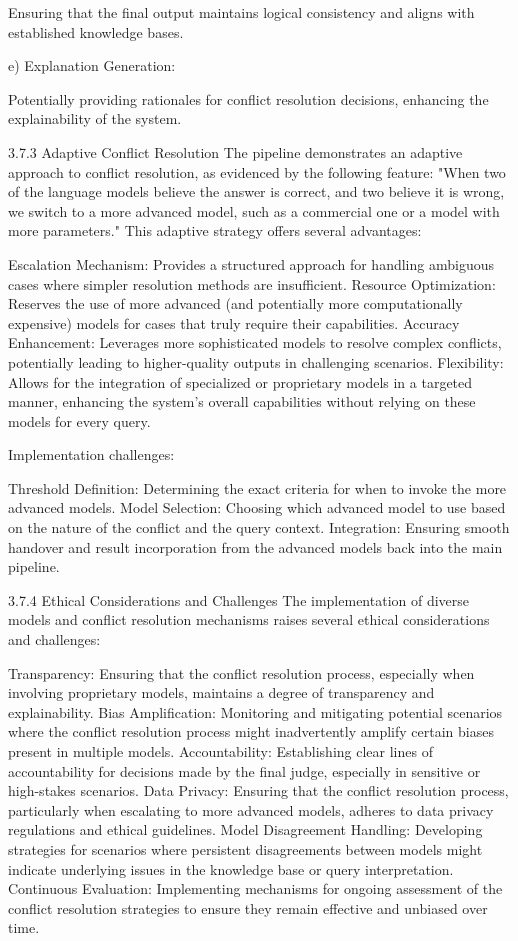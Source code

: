 Ensuring that the final output maintains logical consistency and aligns with established knowledge bases.

e) Explanation Generation:

Potentially providing rationales for conflict resolution decisions, enhancing the explainability of the system.

3.7.3 Adaptive Conflict Resolution
The pipeline demonstrates an adaptive approach to conflict resolution, as evidenced by the following feature:
"When two of the language models believe the answer is correct, and two believe it is wrong, we switch to a more advanced model, such as a commercial one or a model with more parameters."
This adaptive strategy offers several advantages:

Escalation Mechanism: Provides a structured approach for handling ambiguous cases where simpler resolution methods are insufficient.
Resource Optimization: Reserves the use of more advanced (and potentially more computationally expensive) models for cases that truly require their capabilities.
Accuracy Enhancement: Leverages more sophisticated models to resolve complex conflicts, potentially leading to higher-quality outputs in challenging scenarios.
Flexibility: Allows for the integration of specialized or proprietary models in a targeted manner, enhancing the system's overall capabilities without relying on these models for every query.

Implementation challenges:

Threshold Definition: Determining the exact criteria for when to invoke the more advanced models.
Model Selection: Choosing which advanced model to use based on the nature of the conflict and the query context.
Integration: Ensuring smooth handover and result incorporation from the advanced models back into the main pipeline.

3.7.4 Ethical Considerations and Challenges
The implementation of diverse models and conflict resolution mechanisms raises several ethical considerations and challenges:

Transparency: Ensuring that the conflict resolution process, especially when involving proprietary models, maintains a degree of transparency and explainability.
Bias Amplification: Monitoring and mitigating potential scenarios where the conflict resolution process might inadvertently amplify certain biases present in multiple models.
Accountability: Establishing clear lines of accountability for decisions made by the final judge, especially in sensitive or high-stakes scenarios.
Data Privacy: Ensuring that the conflict resolution process, particularly when escalating to more advanced models, adheres to data privacy regulations and ethical guidelines.
Model Disagreement Handling: Developing strategies for scenarios where persistent disagreements between models might indicate underlying issues in the knowledge base or query interpretation.
Continuous Evaluation: Implementing mechanisms for ongoing assessment of the conflict resolution strategies to ensure they remain effective and unbiased over time.

